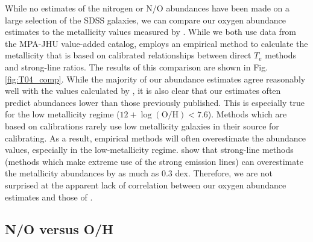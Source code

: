 While no estimates of the nitrogen or N/O abundances have been made on a large 
selection of the SDSS galaxies, we can compare our oxygen abundance estimates to 
the metallicity values measured by \cite{Tremonti04}.  While we both use data 
from the MPA-JHU value-added catalog, \cite{Tremonti04} employs an empirical 
method to calculate the metallicity that is based on calibrated relationships 
between direct $T_e$ methods and strong-line ratios.  The results of this 
comparison are shown in Fig. \ref{fig:T04_comp}.  While the majority of our 
abundance estimates agree reasonably well with the values calculated by 
\cite{Tremonti04}, it is also clear that our estimates often predict abundances 
lower than those previously published.  This is especially true for the low 
metallicity regime ($12 + \log \left(\text{O}/\text{H}\right) < 7.6$).  Methods 
which are based on calibrations rarely use low metallicity galaxies in their 
source for calibrating.  As a result, empirical methods will often overestimate 
the abundance values, especially in the low-metallicity regime.  
\cite{Kennicutt03} show that strong-line methods (methods which make extreme use 
of the strong emission lines) can overestimate the metallicity abundances by as 
much as 0.3 dex.  Therefore, we are not surprised at the apparent lack of 
correlation between our oxygen abundance estimates and those of 
\cite{Tremonti04}.


\subsection{N/O versus O/H} \label{sec:NO_OH}

